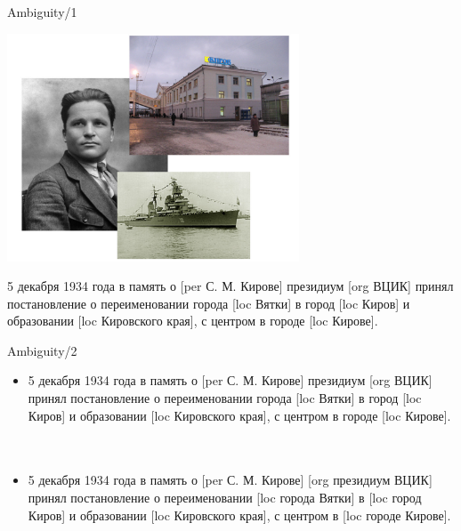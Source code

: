 \documentclass[10pt, compress]{beamer}
\begin{document}
\begin{frame}{Ambiguity/1}

\begin{center}
\includegraphics[width=0.65\textwidth]{graphics/kirov-all.jpg}
\end{center}

5 декабря 1934 года в память о [{\sc per} С. М. Кирове] президиум [{\sc org} ВЦИК] принял постановление о переименовании города [{\sc loc} Вятки] в город [{\sc loc} Киров] и образовании [{\sc loc} Кировского края], с центром в городе [{\sc loc} Кирове].

\end{frame}

\begin{frame}{Ambiguity/2}

\begin{itemize}
\item 5 декабря 1934 года в память о [{\sc per} С. М. Кирове] президиум [{\sc org} ВЦИК] принял постановление о переименовании города [{\sc loc} Вятки] в город [{\sc loc} Киров] и образовании [{\sc loc} Кировского края], с центром в городе [{\sc loc} Кирове].
~\\
~\\
\item 5 декабря 1934 года в память о [{\sc per} С. М. Кирове] [{\sc org} \alert<2>{президиум} ВЦИК] принял постановление о переименовании [{\sc loc} \alert<2>{города} Вятки] в [{\sc loc} \alert<2>{город} Киров] и образовании [{\sc loc} Кировского края], с центром в [{\sc loc} \alert<2>{городе} Кирове].
\end{itemize}

\end{frame}
\end{document}
